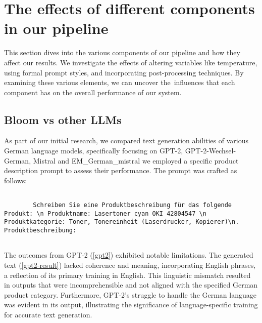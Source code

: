 \section{The effects of different components in our pipeline}

This section dives into the various components of our pipeline and how they affect our results. We investigate the effects of altering variables like temperature, using formal prompt styles, and incorporating post-processing techniques. By examining these various elements, we can uncover the influences that each component has on the overall performance of our system.


\subsection{Bloom vs other LLMs}\label{comparison-of-llms}


As part of our initial research, we compared text generation abilities of various German language models, specifically focusing on GPT-2,  GPT-2-Wechsel-German, Mistral and 
EM\_German\_mistral we employed a specific product description prompt to assess their performance. The prompt was crafted as follows:

{\tiny
	\begin{lstlisting}[breaklines=true, caption={prompt used for GPT-2 and GPT-2-Wechsel-German}, captionpos=b]
		
		Schreiben Sie eine Produktbeschreibung für das folgende Produkt: \n Produktname: Lasertoner cyan OKI 42804547 \n Produktkategorie: Toner, Tonereinheit (Laserdrucker, Kopierer)\n. Produktbeschreibung:
		
	\end{lstlisting}
}


The outcomes from GPT-2 (\autoref{gpt2}) exhibited notable limitations. The generated text (\autoref{gpt2-result}) lacked coherence and meaning, incorporating English phrases, a reflection of its primary training in English. This linguistic mismatch resulted in outputs that were incomprehensible and not aligned with the specified German product category. Furthermore, GPT-2's struggle to handle the German language was evident in its output, illustrating the significance of language-specific training for accurate text generation.

